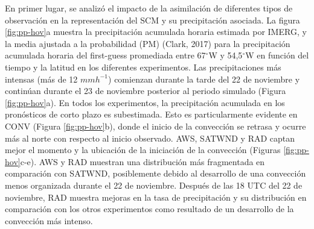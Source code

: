 \documentclass[12pt,oneside]{reedthesis}
\begin{document}
En primer lugar, se analizó el impacto de la asimilación de diferentes tipos de observación en la representación del SCM y su precipitación asociada. La figura \ref{fig:pp-hov}a muestra la precipitación acumulada horaria estimada por IMERG, y la media ajustada a la probabilidad (PM) (Clark, 2017) para la precipitación acumulada horaria del first-guess promediada entre 67\(^{\circ}\)W y 54,5\(^{\circ}\)W en función del tiempo y la latitud en los diferentes experimentos. Las precipitaciones más intensas (más de 12 \(mmh^{-1}\)) comienzan durante la tarde del 22 de noviembre y continúan durante el 23 de noviembre posterior al periodo simulado (Figura \ref{fig:pp-hov}a). En todos los experimentos, la precipitación acumulada en los pronósticos de corto plazo es subestimada. Esto es particularmente evidente en CONV (Figura \ref{fig:pp-hov}b), donde el inicio de la convección se retrasa y ocurre más al norte con respecto al inicio observado. AWS, SATWND y RAD captan mejor el momento y la ubicación de la iniciación de la convección (Figuras \ref{fig:pp-hov}c-e). AWS y RAD muestran una distribución más fragmentada en comparación con SATWND, posiblemente debido al desarrollo de una convección menos organizada durante el 22 de noviembre. Después de las 18 UTC del 22 de noviembre, RAD muestra mejoras en la tasa de precipitación y su distribución en comparación con los otros experimentos como resultado de un desarrollo de la convección más intenso.
\end{document}
